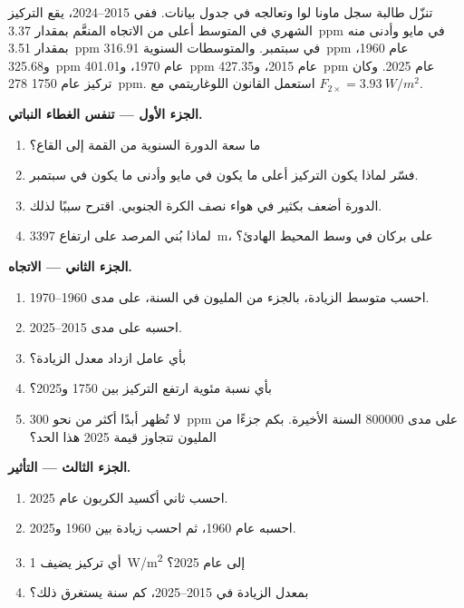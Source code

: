 \begin{problem}
\label{pb:g12:climate-change:1}
تنزّل طالبة سجل ماونا لوا وتعالجه في
جدول بيانات. ففي 2015--2024، يقع التركيز الشهري في المتوسط
أعلى من الاتجاه المنعَّم بمقدار \qty{3.37}{ppm} في مايو وأدنى منه بمقدار \qty{3.51}{ppm}
في سبتمبر. والمتوسطات السنوية \qty{316.91}{ppm} عام 1960،
و\qty{325.68}{ppm} عام 1970، و\qty{401.01}{ppm} عام 2015، و\qty{427.35}{ppm}
عام 2025. وكان تركيز عام 1750 \qty{278}{ppm}. استعمل القانون
اللوغاريتمي مع $F_{2\times} = \qty{3.93}{W/m^2}$.

\medskip
\noindent\textbf{الجزء الأول --- تنفس الغطاء النباتي.}
\begin{enumerate}
  \item ما سعة الدورة السنوية من القمة إلى القاع؟
  \item فسّر لماذا يكون التركيز أعلى ما يكون في مايو وأدنى ما يكون في
        سبتمبر.
  \item الدورة أضعف بكثير في هواء نصف الكرة الجنوبي.
        اقترح سببًا لذلك.
  \item لماذا بُني المرصد على ارتفاع \qty{3397}{m}، على بركان في
        وسط المحيط الهادئ؟
\end{enumerate}

\medskip
\noindent\textbf{الجزء الثاني --- الاتجاه.}
\begin{enumerate}[resume]
  \item احسب متوسط الزيادة، بالجزء من المليون في السنة، على مدى 1960--1970.
  \item احسبه على مدى 2015--2025.
  \item بأي عامل ازداد معدل الزيادة؟
  \item بأي نسبة مئوية ارتفع التركيز بين 1750
        و2025؟
  \item لا تُظهر  أبدًا أكثر من نحو \qty{300}{ppm} على مدى
        \num{800000} السنة الأخيرة. بكم جزءًا من المليون تتجاوز قيمة 2025
        هذا الحد؟
\end{enumerate}

\medskip
\noindent\textbf{الجزء الثالث --- التأثير.}
\begin{enumerate}[resume]
  \item احسب  ثاني أكسيد الكربون عام 2025.
  \item احسبه عام 1960، ثم احسب زيادة  بين 1960
        و2025.
  \item أي تركيز يضيف \qty{1}{W/m^2} إلى  عام 2025؟
  \item بمعدل الزيادة في 2015--2025، كم سنة يستغرق ذلك؟
\end{enumerate}


\end{problem}
